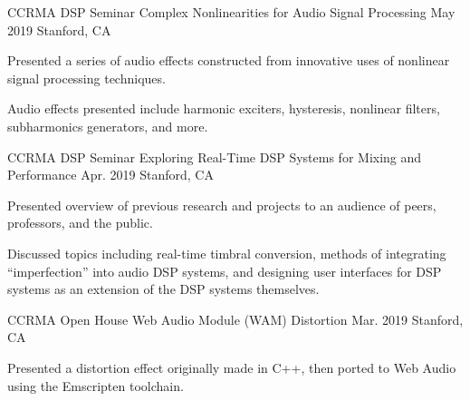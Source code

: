 

\begin{cventries}

  \cventry
    {CCRMA DSP Seminar} %
    {Complex Nonlinearities for Audio Signal Processing} %
    {May 2019} %
    {Stanford, CA} %
    {
      \begin{cvitems} %
        \item {Presented a series of audio effects constructed from
               innovative uses of nonlinear signal processing techniques.}
        \item {Audio effects presented include harmonic exciters, hysteresis,
               nonlinear filters, subharmonics generators, and more.}
      \end{cvitems}
    }

    \cventry
    {CCRMA DSP Seminar} %
    {Exploring Real-Time DSP Systems for Mixing and Performance} %
    {Apr. 2019} %
    {Stanford, CA} %
    {
      \begin{cvitems} %
        \item {Presented overview of previous research and projects to an audience of peers, professors, and the public.}
        \item {Discussed topics including real-time timbral conversion, methods of integrating ``imperfection'' into audio
               DSP systems, and designing user interfaces for DSP systems as an extension of the DSP systems themselves.}
      \end{cvitems}
    }

    \cventry
    {CCRMA Open House} %
    {Web Audio Module (WAM) Distortion} %
    {Mar. 2019} %
    {Stanford, CA} %
    {
      \begin{cvitems} %
        \item {Presented a distortion effect originally made in C++, then ported to Web Audio using the Emscripten toolchain.}
      \end{cvitems}
    }

\end{cventries}
